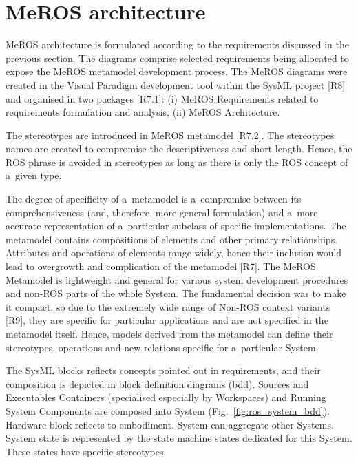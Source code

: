 \documentclass[11pt,oneside,a4paper]{report}
\begin{document}
	
	
\chapter{MeROS architecture}
\label{ch:architecture}

	MeROS architecture is formulated according to the requirements discussed in the previous section. The diagrams comprise selected requirements being allocated to expose the MeROS metamodel development process. 
	The MeROS diagrams were created in the Visual Paradigm development tool within the SysML project [R8] and organised in two packages [R7.1]: (i) MeROS Requirements related to requirements formulation and analysis, (ii) MeROS Architecture.
		
	The stereotypes are introduced in MeROS metamodel [R7.2].
	The stereotypes names are created to compromise the descriptiveness and short length. Hence, the ROS phrase is avoided in stereotypes as long as there is only the ROS concept of a~given type.
	
	The degree of specificity of a~metamodel is a~compromise between its comprehensiveness (and, therefore, more general formulation) and a~more accurate representation of a~particular subclass of specific implementations. The metamodel contains compositions of elements and other primary relationships. Attributes and operations of elements range widely, hence their inclusion would lead to overgrowth and complication of the metamodel [R7]. The MeROS Metamodel is lightweight and general for various system development procedures and non-ROS parts of the whole System. The fundamental decision was to make it compact, so due to the extremely wide range of Non-ROS context variants [R9], they are specific for particular applications and are not specified in the metamodel itself. Hence, models derived from the metamodel can define their stereotypes, operations and new relations specific for a~particular System. 
	
	\pagebreak
	
	The SysML blocks reflects concepts pointed out in requirements, and their composition is depicted in block definition diagrams (bdd). Sources and Executables Containers (specialised especially by Workspaces) and Running System Components are composed into System (Fig.~\ref{fig:ros_system_bdd}). Hardware block reflects to embodiment. System can aggregate other Systems. System state is represented by the state machine states dedicated for this System. These states have specific stereotypes.
	
\end{document}
